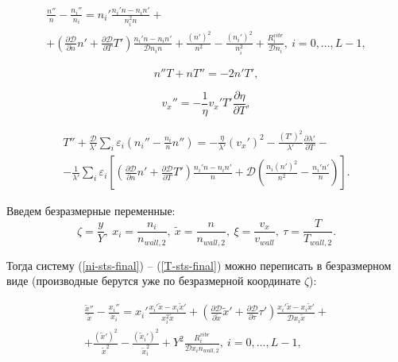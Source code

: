 \documentclass[12pt]{article}
\begin{document}
\begin{multline}
\frac{n''}{n} - \frac{n_{i}''}{n_{i}} = 
  n_{i}' \frac{n_{i}'n - n_{i}n'}{n_{i}^2 n} + \\
  + \left(\frac{\partial \mathcal{D}}{\partial n}n' + \frac{\partial \mathcal{D}}{\partial T}T' \right) \frac{n_{i}'n - n_{i}n'}{\mathcal{D}n_{i}n} + \frac{\left(n'\right)^2}{n^2} - \frac{\left(n_{i}'\right)^2}{n_{i}^2} + \frac{R_{i}^{vibr}}{\mathcal{D}n_{i}},\:i=0,\ldots,L-1,\label{ni-sts-final}
\end{multline}

\begin{equation}
  n''T + nT'' = -2n'T',
\end{equation}

\begin{equation}
  v_{x}'' = -\frac{1}{\eta} v_{x}' T' \frac{\partial \eta}{\partial T},
\end{equation}

\begin{multline}
  T'' + \frac{\mathcal{D}}{\lambda'}\sum_{i}\varepsilon_{i}\left(n_{i}'' - \frac{n_{i}}{n}n'' \right) = -\frac{\eta}{\lambda'} \left(v_{x}' \right)^2 - \frac{\left(T'\right)^2}{\lambda'} \frac{\partial \lambda'}{\partial T} - \\
  - \frac{1}{\lambda'}\sum_{i}\varepsilon_{i} \left[\left(\frac{\partial \mathcal{D}}{\partial n}n' + \frac{\partial \mathcal{D}}{\partial T}T' \right) \frac{n_{i}'n - n_{i}n'}{n} + \mathcal{D}\left(\frac{n_{i}\left(n'\right)^2}{n^2} - \frac{n_{i}'n'}{n} \right)  \right].\label{T-sts-final}
\end{multline}

Введем безразмерные переменные:
\begin{equation}
  \zeta = \frac{y}{Y},\:x_{i} = \frac{n_{i}}{n_{wall,2}},\:\tilde{x}=\frac{n}{n_{wall,2}},\:\xi=\frac{v_{x}}{v_{wall}},\:\tau=\frac{T}{T_{wall,2}}.
\end{equation}

Тогда систему (\ref{ni-sts-final}) -- (\ref{T-sts-final}) можно переписать в безразмерном виде (производные берутся уже по безразмерной координате $\zeta$):

\begin{multline}
\frac{\tilde{x}''}{\tilde{x}} - \frac{x_{i}''}{x_{i}} = 
  x_{i}' \frac{x_{i}'\tilde{x} - x_{i}\tilde{x}'}{x_{i}^2 \tilde{x}} + \left(\frac{\partial \mathcal{D}}{\partial \tilde{x}}\tilde{x}' + \frac{\partial \mathcal{D}}{\partial \tau}\tau' \right) \frac{x_{i}'\tilde{x} - x_{i}\tilde{x}'}{\mathcal{D}x_{i}\tilde{x}} + \\
  + \frac{\left(\tilde{x}'\right)^2}{\tilde{x}^2} - \frac{\left(\tilde{x}_{i}'\right)^2}{\tilde{x}_{i}^2} + Y^{2}\frac{R_{i}^{vibr}}{\mathcal{D}x_{i}n_{wall,2}},\:i=0,\ldots,L-1,\label{ni-sts-final-dimless}
\end{multline}
\end{document}
